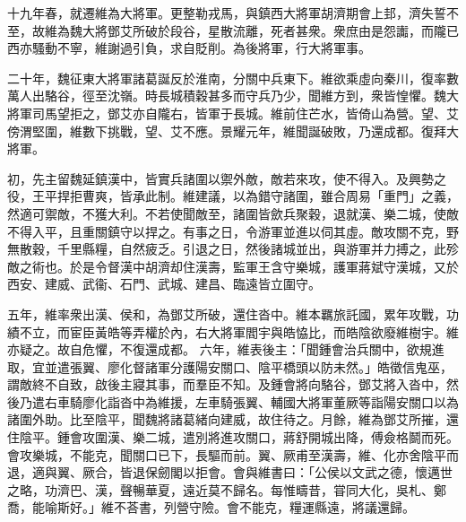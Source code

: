 \begin{pinyinscope}
 
 
 
 十九年春，就遷維為大將軍。更整勒戎馬，與鎮西大將軍胡濟期會上邽，濟失誓不至，故維為魏大將鄧艾所破於段谷，星散流離，死者甚衆。衆庶由是怨讟，而隴已西亦騷動不寧，維謝過引負，求自貶削。為後將軍，行大將軍事。
 
 
 
 
 二十年，魏征東大將軍諸葛誕反於淮南，分關中兵東下。維欲乘虛向秦川，復率數萬人出駱谷，徑至沈嶺。時長城積穀甚多而守兵乃少，聞維方到，衆皆惶懼。魏大將軍司馬望拒之，鄧艾亦自隴右，皆軍于長城。維前住芒水，皆倚山為營。望、艾傍渭堅圍，維數下挑戰，望、艾不應。景耀元年，維聞誕破敗，乃還成都。復拜大將軍。
 
 
 
 
 初，先主留魏延鎮漢中，皆實兵諸圍以禦外敵，敵若來攻，使不得入。及興勢之役，王平捍拒曹爽，皆承此制。維建議，以為錯守諸圍，雖合周易「重門」之義，然適可禦敵，不獲大利。不若使聞敵至，諸圍皆歛兵聚穀，退就漢、樂二城，使敵不得入平，且重關鎮守以捍之。有事之日，令游軍並進以伺其虛。敵攻關不克，野無散穀，千里縣糧，自然疲乏。引退之日，然後諸城並出，與游軍并力搏之，此殄敵之術也。於是令督漢中胡濟却住漢壽，監軍王含守樂城，護軍蔣斌守漢城，又於西安、建威、武衞、石門、武城、建昌、臨遠皆立圍守。
 
 
五年，維率衆出漢、侯和，為鄧艾所破，還住沓中。維本羈旅託國，累年攻戰，功績不立，而宦臣黃皓等弄權於內，右大將軍閻宇與皓恊比，而皓陰欲廢維樹宇。維亦疑之。故自危懼，不復還成都。
 六年，維表後主：「聞鍾會治兵關中，欲規進取，宜並遣張翼、廖化督諸軍分護陽安關口、陰平橋頭以防未然。」皓徵信鬼巫，謂敵終不自致，啟後主寢其事，而羣臣不知。及鍾會將向駱谷，鄧艾將入沓中，然後乃遣右車騎廖化詣沓中為維援，左車騎張翼、輔國大將軍董厥等詣陽安關口以為諸圍外助。比至陰平，聞魏將諸葛緒向建威，故住待之。月餘，維為鄧艾所摧，還住陰平。鍾會攻圍漢、樂二城，遣別將進攻關口，蔣舒開城出降，傅僉格鬬而死。
 會攻樂城，不能克，聞關口已下，長驅而前。翼、厥甫至漢壽，維、化亦舍陰平而退，適與翼、厥合，皆退保劒閣以拒會。會與維書曰：「公侯以文武之德，懷邁世之略，功濟巴、漢，聲暢華夏，遠近莫不歸名。每惟疇昔，甞同大化，吳札、鄭喬，能喻斯好。」維不荅書，列營守險。會不能克，糧運縣遠，將議還歸。
 

\end{pinyinscope}
